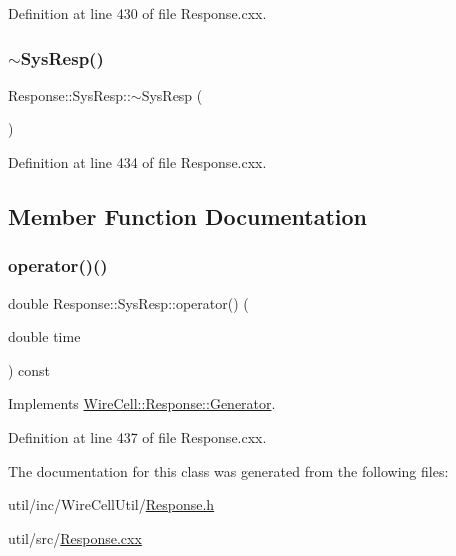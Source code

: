 Definition at line 430 of file Response.\+cxx.

\mbox{\label{class_wire_cell_1_1_response_1_1_sys_resp_a25689ed533b091c96cd5b4bed5359e19}} 
\subsubsection{\texorpdfstring{$\sim$\+Sys\+Resp()}{~SysResp()}}
{\footnotesize\ttfamily Response\+::\+Sys\+Resp\+::$\sim$\+Sys\+Resp (\begin{DoxyParamCaption}{ }\end{DoxyParamCaption})\hspace{0.3cm}{\ttfamily [virtual]}}



Definition at line 434 of file Response.\+cxx.



\subsection{Member Function Documentation}
\mbox{\label{class_wire_cell_1_1_response_1_1_sys_resp_a765f0e9bb4395c2b36344b07e3ee2762}} 
\subsubsection{\texorpdfstring{operator()()}{operator()()}}
{\footnotesize\ttfamily double Response\+::\+Sys\+Resp\+::operator() (\begin{DoxyParamCaption}\item[{double}]{time }\end{DoxyParamCaption}) const\hspace{0.3cm}{\ttfamily [virtual]}}



Implements \hyperlink{class_wire_cell_1_1_response_1_1_generator_a216d7f7bd22a1a781b6b00bd988e0136}{Wire\+Cell\+::\+Response\+::\+Generator}.



Definition at line 437 of file Response.\+cxx.



The documentation for this class was generated from the following files\+:\begin{DoxyCompactItemize}
\item 
util/inc/\+Wire\+Cell\+Util/\hyperlink{_response_8h}{Response.\+h}\item 
util/src/\hyperlink{_response_8cxx}{Response.\+cxx}\end{DoxyCompactItemize}
